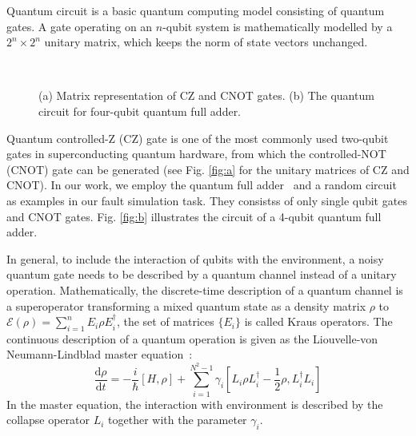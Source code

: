 \documentclass[conference, 9pt]{IEEEtran}
\begin{document}
Quantum circuit is a basic quantum computing model consisting of quantum gates.  %
A gate operating on an $n$-qubit system is mathematically modelled by a $ 2^n \times 2^n$ unitary matrix, which keeps the norm of state  vectors unchanged. %
\begin{figure}
    \centering
    \\
    \caption{(a) Matrix representation of CZ and CNOT gates. (b) The quantum circuit for four-qubit quantum full adder. }
    \label{fig:DJ}
\end{figure}
Quantum controlled-Z (CZ) gate is one of the most commonly used two-qubit gates in superconducting quantum hardware, from which the controlled-NOT (CNOT) gate can be generated (see Fig. \ref{fig:a} for the unitary matrices of CZ and CNOT). 
In our work, we employ the quantum full adder~\cite{Li_2020} and a random circuit as examples in our fault simulation task. They  
consistss of only single qubit gates and CNOT gates. Fig. \ref{fig:b} illustrates the circuit of a 4-qubit quantum full adder.

In general, to include the interaction of qubits with the environment, a noisy quantum gate needs to be described by a quantum channel instead of a unitary operation. Mathematically, the discrete-time description of a quantum channel is a superoperator transforming a mixed quantum state as a density matrix $\rho$ to $\mathcal{E}(\rho) = \sum_{i=1}^{n}E_i\rho E_i^{\dag}$, the set of matrices $\{E_i\}$ is called Kraus operators. The continuous description of a quantum operation is given as the  Liouvelle-von Neumann-Lindblad master equation~\cite{2006The}:
\begin{equation}\label{Lind}
\frac{\text{d}\rho}{\text{d}t} = -\frac{i}{\hbar}[H,\rho] + \sum_{i=1}^{N^2-1}\gamma_i[L_i\rho L_i^{\dag}-\frac{1}{2}{\rho,L_i^{\dag}L_i}]
\end{equation}
In the master equation, the interaction with environment is described by the collapse operator $L_i$ together with the parameter $\gamma_i$. 
\end{document}
